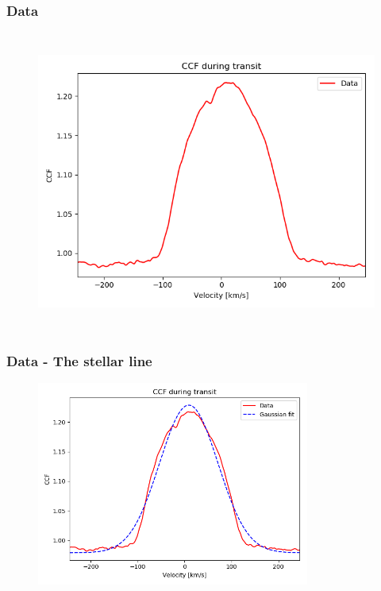 \documentclass[show notes]{beamer}
\begin{document}
\begin{frame}
\frametitle{Data}
\begin{columns}
	
	
	\begin{figure}
		\centering
		\includegraphics[width=\textwidth]{../figures/CCF_it.png}
		\label{fig:CCF_it}
	\end{figure}	
\end{columns}
\end{frame}

\begin{frame}
\frametitle{Data - The stellar line}
\begin{figure}
	\centering
	\includegraphics[width=0.8\textwidth]{../figures/CCF_it_fit.png}
	\label{fig:CCF_fit}
\end{figure}
\end{frame}
\end{document}
